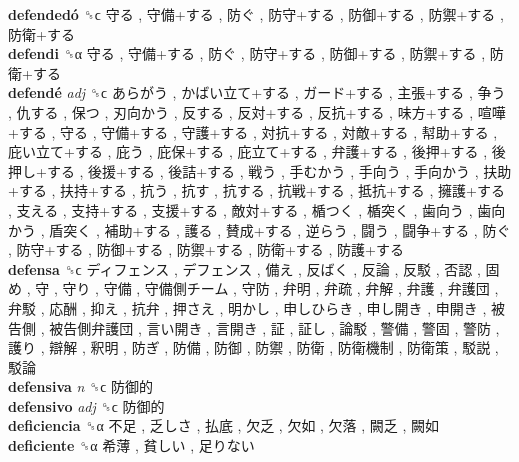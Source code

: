 \textbf{defendedó} ␝ϲ   守る ,  守備+する ,  防ぐ ,  防守+する ,  防御+する ,  防禦+する ,  防衛+する   \\
\textbf{defendi} ␝α   守る ,  守備+する ,  防ぐ ,  防守+する ,  防御+する ,  防禦+する ,  防衛+する   \\
\textbf{defendé} \emph{adj}  ␝ϲ   あらがう ,  かばい立て+する ,  ガード+する ,  主張+する ,  争う ,  仇する ,  保つ ,  刃向かう ,  反する ,  反対+する ,  反抗+する ,  味方+する ,  喧嘩+する ,  守る ,  守備+する ,  守護+する ,  対抗+する ,  対敵+する ,  幇助+する ,  庇い立て+する ,  庇う ,  庇保+する ,  庇立て+する ,  弁護+する ,  後押+する ,  後押し+する ,  後援+する ,  後詰+する ,  戦う ,  手むかう ,  手向う ,  手向かう ,  扶助+する ,  扶持+する ,  抗う ,  抗す ,  抗する ,  抗戦+する ,  抵抗+する ,  擁護+する ,  支える ,  支持+する ,  支援+する ,  敵対+する ,  楯つく ,  楯突く ,  歯向う ,  歯向かう ,  盾突く ,  補助+する ,  護る ,  賛成+する ,  逆らう ,  闘う ,  闘争+する ,  防ぐ ,  防守+する ,  防御+する ,  防禦+する ,  防衛+する ,  防護+する   \\
\textbf{defensa} ␝ϲ   ディフェンス ,  デフェンス ,  備え ,  反ばく ,  反論 ,  反駁 ,  否認 ,  固め ,  守 ,  守り ,  守備 ,  守備側チーム ,  守防 ,  弁明 ,  弁疏 ,  弁解 ,  弁護 ,  弁護団 ,  弁駁 ,  応酬 ,  抑え ,  抗弁 ,  押さえ ,  明かし ,  申しひらき ,  申し開き ,  申開き ,  被告側 ,  被告側弁護団 ,  言い開き ,  言開き ,  証 ,  証し ,  論駁 ,  警備 ,  警固 ,  警防 ,  護り ,  辯解 ,  釈明 ,  防ぎ ,  防備 ,  防御 ,  防禦 ,  防衛 ,  防衛機制 ,  防衛策 ,  駁説 ,  駁論   \\
\textbf{defensiva} \emph{n}  ␝ϲ   防御的   \\
\textbf{defensivo} \emph{adj}  ␝ϲ   防御的   \\
\textbf{deficiencia} ␝α   不足 ,  乏しさ ,  払底 ,  欠乏 ,  欠如 ,  欠落 ,  闕乏 ,  闕如   \\
\textbf{deficiente} ␝α   希薄 ,  貧しい ,  足りない   \\
